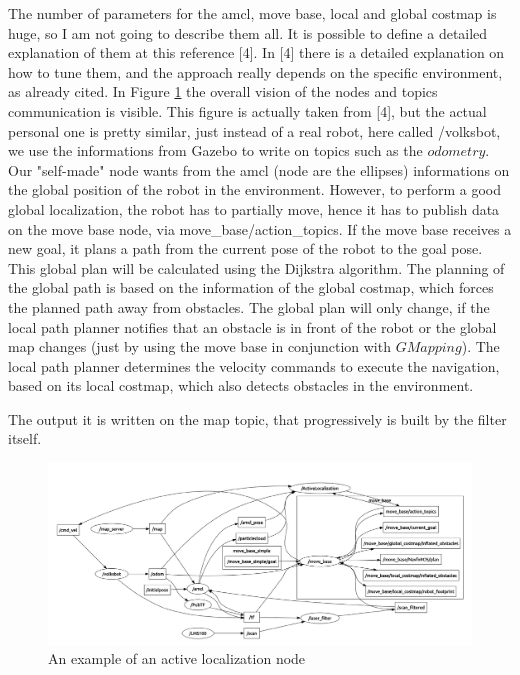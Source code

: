 \documentclass[11pt,a4paper]{article}
\begin{document}
The number of parameters for the amcl, move base, local and global costmap is huge, so I am not going to describe them all. It is possible to define a detailed explanation of them at this reference [4]. In [4] there is a detailed explanation on how to tune them, and the approach really depends on the specific environment, as already cited.
In Figure \ref{fig:active_locnode} the overall vision of the nodes and topics communication is visible. This figure is actually taken from [4], but the actual personal one is pretty similar, just instead of a real robot, here called /volksbot, we use the informations from Gazebo to write on topics such as the $odometry$. Our "self-made" node wants from the amcl (node are the ellipses) informations on the global position of the robot in the environment. However, to perform a good global localization, the robot has to partially move, hence it has to publish data on the move base node, via move{\_}base/action{\_}topics. If the move base receives a new goal, it plans a path from the current pose of the robot to the goal pose. This global plan will be calculated using the Dijkstra algorithm. The planning of the global path is based on the information of the global costmap, which forces the planned path away from obstacles. The global plan will only change, if the local path planner notifies that an obstacle is in front of the robot or the global map changes (just by using the move base in conjunction with $GMapping$). The local path planner determines the velocity commands to execute the navigation, based on its local
costmap, which also detects obstacles in the environment.

The output it is written on the map topic, that progressively is built by the filter itself. 

\begin{figure}[!htb]
	\center
	\includegraphics[width=1\textwidth]{figures/active_localization_node.png}
	\caption{An example of an active localization node}
	\label{fig:active_locnode}
\end{figure}
\end{document}
